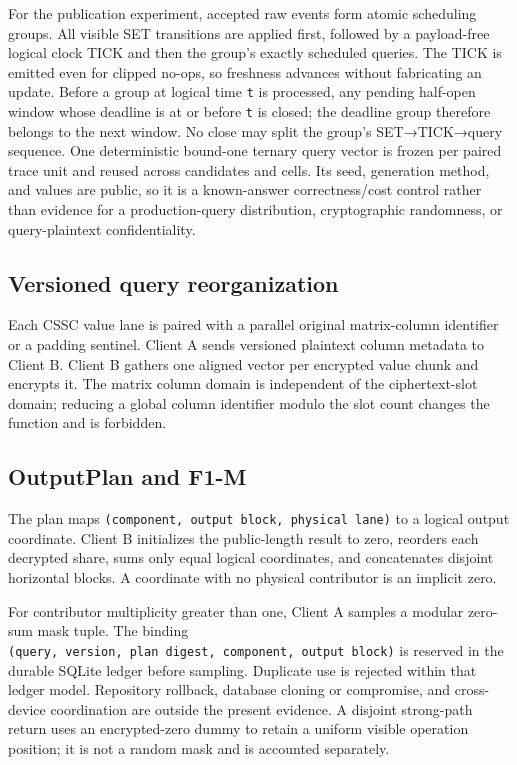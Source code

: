 For the publication experiment, accepted raw events form atomic scheduling groups. All visible SET transitions are applied first, followed by a payload-free logical clock TICK and then the group's exactly scheduled queries. The TICK is emitted even for clipped no-ops, so freshness advances without fabricating an update. Before a group at logical time \texttt{t} is processed, any pending half-open window whose deadline is at or before \texttt{t} is closed; the deadline group therefore belongs to the next window. No close may split the group's SET→TICK→query sequence. One deterministic bound-one ternary query vector is frozen per paired trace unit and reused across candidates and cells. Its seed, generation method, and values are public, so it is a known-answer correctness/cost control rather than evidence for a production-query distribution, cryptographic randomness, or query-plaintext confidentiality.

\subsection{Versioned query reorganization}\label{versioned-query-reorganization}

Each CSSC value lane is paired with a parallel original matrix-column identifier or a padding sentinel. Client A sends versioned plaintext column metadata to Client B. Client B gathers one aligned vector per encrypted value chunk and encrypts it. The matrix column domain is independent of the ciphertext-slot domain; reducing a global column identifier modulo the slot count changes the function and is forbidden.

\subsection{OutputPlan and F1-M}\label{outputplan-and-f1-m}

The plan maps \texttt{(component,\ output\ block,\ physical\ lane)} to a logical output coordinate. Client B initializes the public-length result to zero, reorders each decrypted share, sums only equal logical coordinates, and concatenates disjoint horizontal blocks. A coordinate with no physical contributor is an implicit zero.

For contributor multiplicity greater than one, Client A samples a modular zero-sum mask tuple. The binding \texttt{(query,\ version,\ plan\ digest,\ component,\ output\ block)} is reserved in the durable SQLite ledger before sampling. Duplicate use is rejected within that ledger model. Repository rollback, database cloning or compromise, and cross-device coordination are outside the present evidence. A disjoint strong-path return uses an encrypted-zero dummy to retain a uniform visible operation position; it is not a random mask and is accounted separately.


